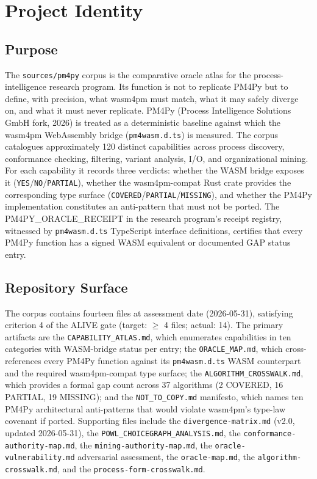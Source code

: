 
\section{Project Identity}
\label{sec:sources-pm4py-identity}

\subsection{Purpose}
\label{sec:sources-pm4py-identity-purpose}

The \texttt{sources/pm4py} corpus is the comparative oracle atlas for the process-intelligence
research program. Its function is not to replicate PM4Py but to define, with precision, what
wasm4pm must match, what it may safely diverge on, and what it must never replicate. PM4Py
(Process Intelligence Solutions GmbH fork, 2026) is treated as a deterministic baseline
against which the wasm4pm WebAssembly bridge (\texttt{pm4wasm.d.ts}) is measured. The corpus
catalogues approximately 120 distinct capabilities across process discovery, conformance
checking, filtering, variant analysis, I/O, and organizational mining. For each capability
it records three verdicts: whether the WASM bridge exposes it (\texttt{YES}/\texttt{NO}/\texttt{PARTIAL}),
whether the wasm4pm-compat Rust crate provides the corresponding type surface
(\texttt{COVERED}/\texttt{PARTIAL}/\texttt{MISSING}), and whether the PM4Py implementation
constitutes an anti-pattern that must not be ported. The PM4PY\_ORACLE\_RECEIPT in the
research program's receipt registry, witnessed by \texttt{pm4wasm.d.ts} TypeScript interface
definitions, certifies that every PM4Py function has a signed WASM equivalent or documented
GAP status entry.

\subsection{Repository Surface}
\label{sec:sources-pm4py-identity-surface}

The corpus contains fourteen files at assessment date (2026-05-31), satisfying criterion 4
of the ALIVE gate (target: $\geq$ 4 files; actual: 14). The primary artifacts are the
\texttt{CAPABILITY\_ATLAS.md}, which enumerates capabilities in ten categories with
WASM-bridge status per entry; the \texttt{ORACLE\_MAP.md}, which cross-references every
PM4Py function against its \texttt{pm4wasm.d.ts} WASM counterpart and the required
wasm4pm-compat type surface; the \texttt{ALGORITHM\_CROSSWALK.md}, which provides a formal
gap count across 37 algorithms (2 COVERED, 16 PARTIAL, 19 MISSING); and the
\texttt{NOT\_TO\_COPY.md} manifesto, which names ten PM4Py architectural anti-patterns that
would violate wasm4pm's type-law covenant if ported. Supporting files include the
\texttt{divergence-matrix.md} (v2.0, updated 2026-05-31), the
\texttt{POWL\_CHOICEGRAPH\_ANALYSIS.md}, the \texttt{conformance-authority-map.md},
the \texttt{mining-authority-map.md}, the \texttt{oracle-vulnerability.md} adversarial
assessment, the \texttt{oracle-map.md}, the \texttt{algorithm-crosswalk.md}, and the
\texttt{process-form-crosswalk.md}.

